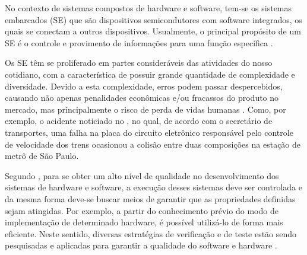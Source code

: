 
\par
No contexto de sistemas compostos de hardware e software, tem-se os sistemas embarcados (SE) que são dispositivos semicondutores com software integrados, os quais se conectam a outros dispositivos. Usualmente, o principal propósito de um SE é o controle e provimento de informações para uma função específica \cite{ramesh2012energy}. 

\par

\par
Os SE têm se proliferado em partes consideráveis das atividades do nosso cotidiano, com a característica de possuir grande quantidade de complexidade e diversidade. Devido a esta complexidade, erros podem passar despercebidos, causando não apenas penalidades econômicas e/ou fracassos do produto no mercado, mas principalmente o risco de perda de vidas humanas \cite{cabodi2016hardware}. Como, por exemplo, o acidente noticiado no \cite{g1Acidente}, no qual, de acordo com o secretário de transportes, uma falha na placa do circuito eletrônico responsável pelo controle de velocidade dos trens ocasionou a colisão entre duas composições na estação de metrô de São Paulo.

\par
Segundo , para se obter um alto nível de qualidade no desenvolvimento dos sistemas de hardware e software, a execução desses sistemas deve ser controlada e da mesma forma deve-se buscar meios de garantir que as propriedades definidas sejam atingidas. Por exemplo, a partir do conhecimento prévio do modo de implementação de determinado hardware, é possível utilizá-lo de forma mais eficiente. Neste sentido, diversas estratégias de verificação e de teste estão sendo pesquisadas e aplicadas para garantir a qualidade do software e hardware \cite{hoder2010interpolation,rocha2010exploiting,brayton2010abc,cordeiro2012smt,cabodi2016hardware}.

